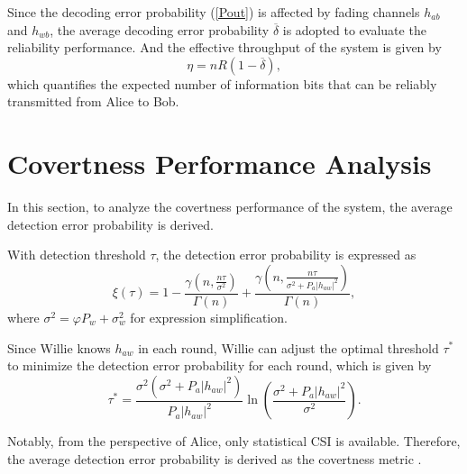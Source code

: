 \documentclass[conference]{IEEEtran}
\begin{document}
Since the decoding error probability (\ref{Pout}) is affected by fading channels $h_{ab}$ and $h_{wb}$, the average decoding error probability $\overline \delta$ is adopted to evaluate the reliability performance. And the effective throughput of the system is given by\cite{ECT2}
\begin{equation}\label{obj}
	\eta  = nR\left( {1 - \overline \delta  } \right),
\end{equation}
which quantifies the expected number of information bits that can be reliably transmitted from Alice to Bob.

\section{Covertness Performance Analysis}
In this section, to analyze the covertness performance of the system, the average detection error probability is derived.

With detection threshold $\tau$, the detection error probability is expressed as \cite{Gaussian}
\begin{equation}\label{ori}
	\xi \left( \tau  \right) = 1 - \frac{{\gamma \left( {n,\frac{{n\tau }}{{{\sigma ^2}}}} \right)}}{{\Gamma \left( n \right)}} + \frac{{\gamma \left( {n,\frac{{n\tau }}{{{\sigma ^2} + {P_a}{{\left| {{h_{aw}}} \right|}^2}}}} \right)}}{{\Gamma \left( n \right)}},
\end{equation}
where ${\sigma ^2} = \varphi {P_w} + \sigma _w^2$ for expression simplification.

Since Willie knows $h_{aw}$ in each round, Willie can adjust the optimal threshold $\tau^*$ to minimize the detection error probability for each round, which is given by \cite{Gaussian}
\begin{equation}\label{opt_threshold}
	{\tau ^*} = \frac{{{\sigma ^2}\left( {{\sigma ^2} + {P_a}{{\left| {{h_{aw}}} \right|}^2}} \right)}}{{{P_a}{{\left| {{h_{aw}}} \right|}^2}}}\ln \left( {\frac{{{\sigma ^2} + {P_a}{{\left| {{h_{aw}}} \right|}^2}}}{{{\sigma ^2}}}} \right).
\end{equation}

Notably, from the perspective of Alice, only statistical CSI is available. Therefore, the average detection error probability is derived as the covertness metric \cite{Fading3}.
\end{document}
